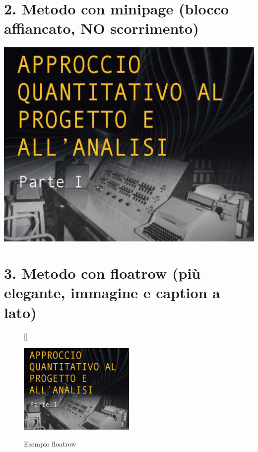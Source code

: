 \documentclass[12pt]{book}
\begin{document}
\newpage

\section*{2. Metodo con minipage (blocco affiancato, NO scorrimento)}
\noindent
\begin{minipage}{0.5\textwidth}
\lipsum[3-4] %
\end{minipage}%
\hfill
\begin{minipage}{0.5\textwidth}
\centering
\includegraphics[width=\linewidth]{images/Lez01_p01_fig_01.png}
\end{minipage}

\newpage

\section*{3. Metodo con floatrow (più elegante, immagine e caption a lato)}

\lipsum[9-10] %
\begin{figure}[h]
[\FBwidth]
{\caption{Esempio floatrow}}
{\includegraphics[width=0.5\textwidth]{images/Lez01_p01_fig_01.png}}
\end{figure}

\lipsum[5-6] %
\end{document}
